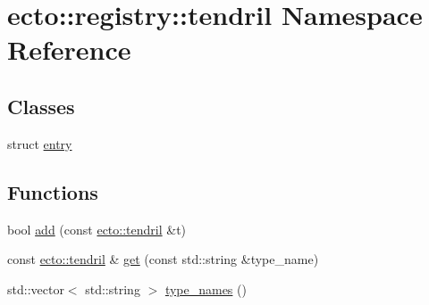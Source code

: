 \hypertarget{namespaceecto_1_1registry_1_1tendril}{\section{ecto\-:\-:registry\-:\-:tendril \-Namespace \-Reference}
\label{namespaceecto_1_1registry_1_1tendril}
}
\subsection*{\-Classes}
\begin{DoxyCompactItemize}
\item 
struct \hyperlink{structecto_1_1registry_1_1tendril_1_1entry}{entry}
\end{DoxyCompactItemize}
\subsection*{\-Functions}
\begin{DoxyCompactItemize}
\item 
bool \hyperlink{namespaceecto_1_1registry_1_1tendril_ae22480a936472049982cbab1f0ebb042}{add} (const \hyperlink{classecto_1_1tendril}{ecto\-::tendril} \&t)
\item 
const \hyperlink{classecto_1_1tendril}{ecto\-::tendril} \& \hyperlink{namespaceecto_1_1registry_1_1tendril_a0f79f6d8838565c91f43e05c93a3f01d}{get} (const std\-::string \&type\-\_\-name)
\item 
std\-::vector$<$ std\-::string $>$ \hyperlink{namespaceecto_1_1registry_1_1tendril_a7e62217ece919ba72bb0aca35c93fd7b}{type\-\_\-names} ()
\end{DoxyCompactItemize}


